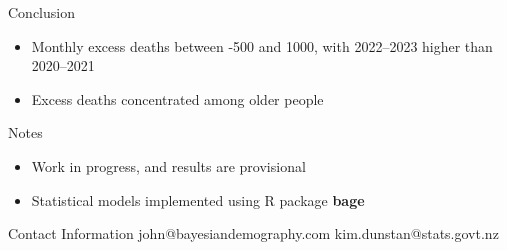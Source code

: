 \documentclass[final]{beamer}
\newlength{\onecolwid}
\begin{document}
\begin{frame}[t]
\begin{columns}[t]
\begin{column}{\onecolwid}
  
\begin{block}{Conclusion}
  \begin{itemize}
  \item Monthly excess deaths between -500 and 1000, with 2022--2023 higher than 2020--2021
  \item Excess deaths concentrated among older people
  \end{itemize}
\end{block}

\begin{block}{Notes}
\begin{itemize}
\item Work in progress, and results are provisional
\item Statistical models implemented using R package \textbf{bage}
\end{itemize}
\end{block}


\begin{alertblock}{Contact Information}
  john@bayesiandemography.com
  kim.dunstan@stats.govt.nz
\end{alertblock}


\end{column} %

\end{columns} %

\end{frame} %
\end{document}
